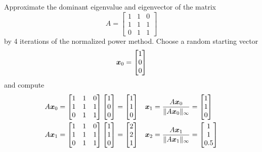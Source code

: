 \begin{example}
Approximate the dominant eigenvalue and eigenvector of the matrix
$$
A = \begin{bmatrix} 1 & 1 & 0 \\ 1 & 1 & 1 \\ 0 & 1 & 1 \end{bmatrix}
$$
by 4 iterations of the normalized power method. Choose a random starting vector
$$
\boldsymbol{x}_0 = \begin{bmatrix} 1 \\ 0 \\ 0 \end{bmatrix}
$$
and compute
\begin{align*}
A \bs{x}_0 &=
\begin{bmatrix} 1 & 1 & 0 \\ 1 & 1 & 1 \\ 0 & 1 & 1 \end{bmatrix}
\begin{bmatrix} 1 \\ 0 \\ 0 \end{bmatrix}
=
\begin{bmatrix} 1 \\ 1 \\ 0 \end{bmatrix}
&
\bs{x}_1 = \frac{A \bs{x}_0}{\| A \bs{x}_0 \|_{\infty}}
&=
\begin{bmatrix} 1 \\ 1 \\ 0 \end{bmatrix}
\\
A \bs{x}_1 &=
\begin{bmatrix} 1 & 1 & 0 \\ 1 & 1 & 1 \\ 0 & 1 & 1 \end{bmatrix}
\begin{bmatrix} 1 \\ 1 \\ 0 \end{bmatrix}
=
\begin{bmatrix} 2 \\ 2 \\ 1 \end{bmatrix}
&
\bs{x}_2 = \frac{A \bs{x}_1}{\| A \bs{x}_1 \|_{\infty}}
&=
\begin{bmatrix} 1 \\ 1 \\ 0.5 \end{bmatrix}
\\

\end{align*}
\end{example}
